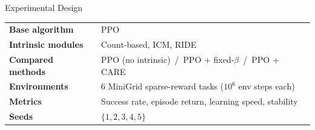 \documentclass[10pt,aspectratio=169]{beamer}
\begin{document}
\begin{frame}{Experimental Design}
  \centering
  \footnotesize
  \begin{tabular}{@{}>{\bfseries}p{3.2cm}p{8.8cm}@{}}
    \toprule
    Base algorithm     & PPO \\[0.35em]
    Intrinsic modules  & Count-based, ICM, RIDE \\[0.35em]
    Compared methods   & PPO (no intrinsic) \,/\, PPO + fixed-$\beta$ \,/\, PPO + CARE \\[0.35em]
    Environments       & 6 MiniGrid sparse-reward tasks ($10^6$ env steps each) \\[0.35em]
    Metrics            & Success rate, episode return, learning speed, stability \\[0.35em]
    Seeds              & $\{1,2,3,4,5\}$ \\
    \bottomrule
  \end{tabular}

  \vspace{0.3cm}


\end{frame}
\end{document}
